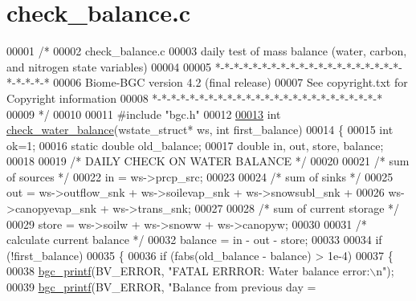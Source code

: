 \hypertarget{check__balance_8c_source}{}\section{check\+\_\+balance.\+c}
\label{check__balance_8c_source}

\begin{DoxyCode}
00001 \textcolor{comment}{/* }
00002 \textcolor{comment}{check\_balance.c}
00003 \textcolor{comment}{daily test of mass balance (water, carbon, and nitrogen state variables)}
00004 \textcolor{comment}{}
00005 \textcolor{comment}{*-*-*-*-*-*-*-*-*-*-*-*-*-*-*-*-*-*-*-*-*-*-*-*-*}
00006 \textcolor{comment}{Biome-BGC version 4.2 (final release)}
00007 \textcolor{comment}{See copyright.txt for Copyright information}
00008 \textcolor{comment}{*-*-*-*-*-*-*-*-*-*-*-*-*-*-*-*-*-*-*-*-*-*-*-*-*}
00009 \textcolor{comment}{*/}
00010 
00011 \textcolor{preprocessor}{#include "bgc.h"}
00012 
\hypertarget{check__balance_8c_source_l00013}{}\hyperlink{check__balance_8c_a7c3407e1cb5eb1e58ac2ac744a6156d6}{00013} \textcolor{keywordtype}{int} \hyperlink{check__balance_8c_a7c3407e1cb5eb1e58ac2ac744a6156d6}{check\_water\_balance}(wstate\_struct* ws, \textcolor{keywordtype}{int} first\_balance)
00014 \{
00015     \textcolor{keywordtype}{int} ok=1;
00016     \textcolor{keyword}{static} \textcolor{keywordtype}{double} old\_balance;
00017     \textcolor{keywordtype}{double} in, out, store, balance;
00018     
00019     \textcolor{comment}{/* DAILY CHECK ON WATER BALANCE */}
00020     
00021     \textcolor{comment}{/* sum of sources */}
00022     in = ws->prcp\_src;
00023     
00024     \textcolor{comment}{/* sum of sinks */}
00025     out = ws->outflow\_snk + ws->soilevap\_snk + ws->snowsubl\_snk + 
00026         ws->canopyevap\_snk + ws->trans\_snk;
00027         
00028     \textcolor{comment}{/* sum of current storage */}
00029     store = ws->soilw + ws->snoww + ws->canopyw;
00030     
00031     \textcolor{comment}{/* calculate current balance */}
00032     balance = in - out - store;
00033      
00034     \textcolor{keywordflow}{if} (!first\_balance)
00035     \{
00036         \textcolor{keywordflow}{if} (fabs(old\_balance - balance) > 1e-4)
00037         \{
00038             \hyperlink{bgc__io_8c_af287cce6e2aede1ce337de9319e80d0d}{bgc\_printf}(BV\_ERROR, \textcolor{stringliteral}{"FATAL ERRROR: Water balance error:\(\backslash\)n"});
00039             \hyperlink{bgc__io_8c_af287cce6e2aede1ce337de9319e80d0d}{bgc\_printf}(BV\_ERROR, \textcolor{stringliteral}{"Balance from previous day = %
}
\end{DoxyCode}
